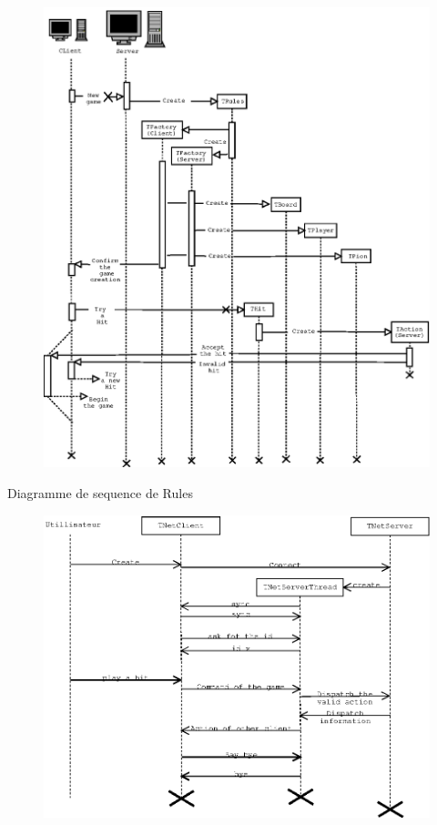 \documentclass[french,12pt]{report}
\begin{document}
\begin{center}

\begin{figure}[h]
\includegraphics[width=14cm]{DSequenceRules.eps}
\end{figure}

Diagramme de sequence de Rules

\pagebreak

\begin{figure}[h]
\includegraphics[width=16cm]{DSRe.eps}
\end{figure}


\end{center}
\end{document}
